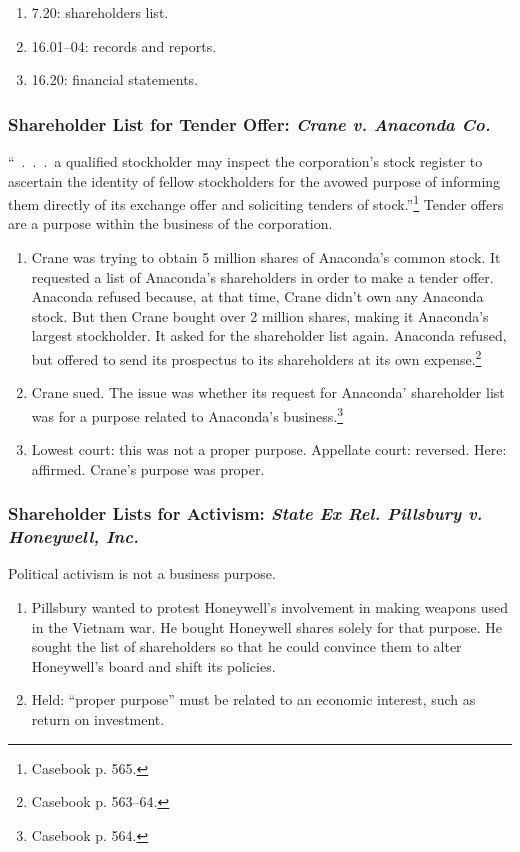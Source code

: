 \begin{enumerate}
    \item 7.20: shareholders list.
    \item 16.01--04: records and reports.
    \item 16.20: financial statements.
\end{enumerate}

\subsubsection{Shareholder List for Tender Offer: \emph{Crane v. Anaconda Co.}}

``~.~.~.~a qualified stockholder may inspect the corporation's stock register to 
ascertain the identity of fellow stockholders for the avowed purpose of 
informing them directly of its exchange offer and soliciting tenders of 
stock.''\footnote{Casebook p. 565.} Tender offers are a purpose within the 
business of the corporation.

\begin{enumerate}
    \item Crane was trying to obtain 5 million shares of Anaconda's common 
    stock. It requested a list of Anaconda's shareholders in order to make a 
    tender offer. Anaconda refused because, at that time, Crane didn't own any 
    Anaconda stock. But then Crane bought over 2 million shares, making it 
    Anaconda's largest stockholder. It asked for the shareholder list again. 
    Anaconda refused, but offered to send its prospectus to its shareholders at 
    its own expense.\footnote{Casebook p. 563--64.}
    \item Crane sued. The issue was whether its request for Anaconda' 
    shareholder list was for a purpose related to Anaconda's 
    business.\footnote{Casebook p. 564.}
    \item Lowest court: this was not a proper purpose. Appellate court: 
    reversed. Here: affirmed. Crane's purpose was proper.
\end{enumerate}

\subsubsection{Shareholder Lists for Activism: \emph{State Ex Rel. Pillsbury v. 
Honeywell, Inc.}}

Political activism is not a business purpose.

\begin{enumerate}
    \item Pillsbury wanted to protest Honeywell's involvement in making weapons 
    used in the Vietnam war. He bought Honeywell shares solely for that purpose. 
    He sought the list of shareholders so that he could convince them to alter 
    Honeywell's board and shift its policies.
    \item Held: ``proper purpose'' must be related to an economic interest, such 
    as return on investment.
\end{enumerate}

